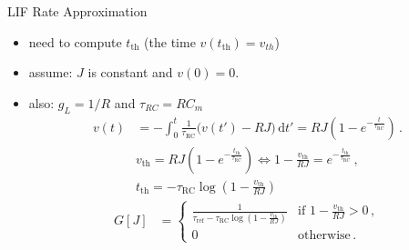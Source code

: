\documentclass[handout,aspectratio=169]{beamer}
\begin{document}
\begin{frame}{LIF Rate Approximation}
	\begin{itemize}
		\item need to compute $t_\mathrm{th}$ (the time $v(t_\mathrm{th})=v_{th}$)
		\item assume: $J$ is constant and $v(0) = 0$. 
		\item also: $g_L = 1/R$ and $\tau_{RC} = R C_m$
		\begin{align*}
			v(t) &= - \int_0^t \frac{1}{\tau_\mathrm{RC}} \big( v(t') - RJ \big) \,\mathrm{d}t'
			= RJ \left(1 - e^{-\frac{t}{\tau_\mathrm{RC}}} \right) \,.
		\end{align*}
		\begin{align*}
			v_\mathrm{th} = RJ \left(1 - e^{-\frac{t_\mathrm{th}}{\tau_\mathrm{RC}}} \right) 
			\Leftrightarrow 1 - \frac{v_\mathrm{th}}{RJ} = e^{-\frac{t_\mathrm{th}}{\tau_\mathrm{RC}}} \,, \\
			t_\mathrm{th} = - \tau_\mathrm{RC} \log \left( 1 - \frac{v_\mathrm{th}}{RJ} \right)
		\end{align*}
	\begin{align*}
		G[J]
		&= \begin{cases}
			\frac{1}{\tau_\mathrm{ref} - \tau_\mathrm{RC} \log \left( 1 - \frac{v_\mathrm{th}}{RJ} \right)} & \text{if } 1 - \frac{v_\mathrm{th}}{RJ} > 0 \,,\\
			0 & \mathrm{otherwise} \,.
		\end{cases}
	\end{align*}
	
	
	\end{itemize}

\end{frame}
\end{document}
